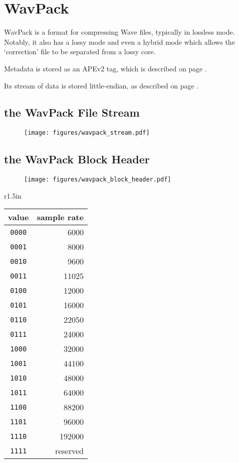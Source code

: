 
\chapter{WavPack}
WavPack is a format for compressing Wave files, typically in lossless mode.
Notably, it also has a lossy mode and even a hybrid mode which allows
the `correction' file to be separated from a lossy core.

Metadata is stored as an APEv2 tag, which is described on page \pageref{apev2}.

Its stream of data is stored little-endian, as described on page
\pageref{bitstreams}.

\section{the WavPack File Stream}
\begin{figure}[h]
\texttt{[image: figures/wavpack\_stream.pdf]}
\end{figure}

\clearpage

\section{the WavPack Block Header}
\begin{figure}[h]
\texttt{[image: figures/wavpack\_block\_header.pdf]}
\end{figure}
\begin{wrapfigure}[10]{r}{1.5in}
\begin{tabular}{|c|r|}
\hline
value & sample rate \\
\hline
\texttt{0000} & 6000 \\
\texttt{0001} & 8000 \\
\texttt{0010} & 9600 \\
\texttt{0011} & 11025 \\
\texttt{0100} & 12000 \\
\texttt{0101} & 16000 \\
\texttt{0110} & 22050 \\
\texttt{0111} & 24000 \\
\texttt{1000} & 32000 \\
\texttt{1001} & 44100 \\
\texttt{1010} & 48000 \\
\texttt{1011} & 64000 \\
\texttt{1100} & 88200 \\
\texttt{1101} & 96000 \\
\texttt{1110} & 192000 \\
\texttt{1111} & reserved \\
\hline
\end{tabular}
\end{wrapfigure}

